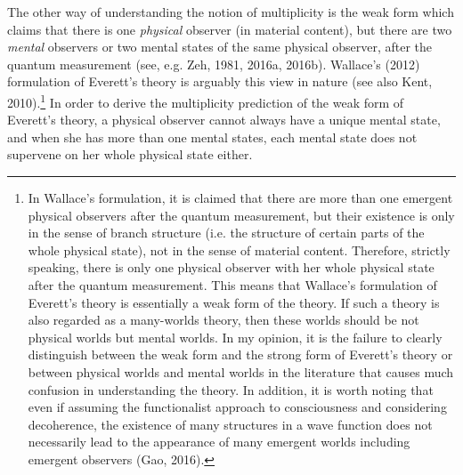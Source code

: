 The other way of understanding the notion of multiplicity is the weak form which claims that there is one \emph{physical} observer (in material content), but there are two \emph{mental} observers or two mental states of the same physical observer, after the quantum measurement (see, e.g. Zeh, 1981, 2016a, 2016b).
Wallace's (2012) formulation of Everett's theory is arguably this view in nature (see also Kent, 2010).\footnote{In Wallace's formulation, it is claimed that there are more than one emergent physical observers after the quantum measurement, but their existence is only in the sense of branch structure (i.e. the structure of certain parts of the whole physical state), not in the sense of material content. Therefore, strictly speaking, there is only one physical observer with her whole physical state after the quantum measurement. This means that Wallace's formulation of Everett's theory is essentially a weak form of the theory. If such a theory is also regarded as a many-worlds theory, then these worlds should be not physical worlds but mental worlds. In my opinion, it is the failure to clearly distinguish between the weak form and the strong form of Everett's theory or between physical worlds and mental worlds in the literature that causes much confusion in understanding the theory. In addition, it is worth noting that even if assuming the functionalist approach to consciousness and considering decoherence, the existence of many structures in a wave function does not necessarily lead to the appearance of many emergent worlds including emergent observers (Gao, 2016).} %
In order to derive the multiplicity prediction of the weak form of Everett's theory, 
a physical observer cannot always have a unique mental state, and when she has more than one mental states, each mental state does not supervene on her whole physical state either.

